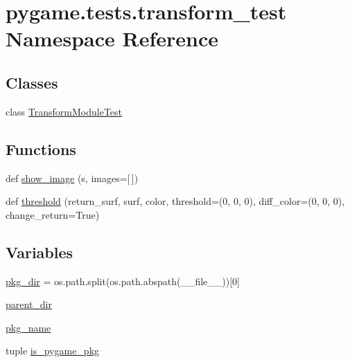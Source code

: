 \hypertarget{namespacepygame_1_1tests_1_1transform__test}{}\section{pygame.\+tests.\+transform\+\_\+test Namespace Reference}
\label{namespacepygame_1_1tests_1_1transform__test}
\subsection*{Classes}
\begin{DoxyCompactItemize}
\item 
class \hyperlink{classpygame_1_1tests_1_1transform__test_1_1_transform_module_test}{Transform\+Module\+Test}
\end{DoxyCompactItemize}
\subsection*{Functions}
\begin{DoxyCompactItemize}
\item 
def \hyperlink{namespacepygame_1_1tests_1_1transform__test_afaa0a3a8b4fe6a56533daf366230f591}{show\+\_\+image} (s, images=\mbox{[}$\,$\mbox{]})
\item 
def \hyperlink{namespacepygame_1_1tests_1_1transform__test_ab035edff24ce1faee9938bec517421ca}{threshold} (return\+\_\+surf, surf, color, threshold=(0, 0, 0), diff\+\_\+color=(0, 0, 0), change\+\_\+return=True)
\end{DoxyCompactItemize}
\subsection*{Variables}
\begin{DoxyCompactItemize}
\item 
\hyperlink{namespacepygame_1_1tests_1_1transform__test_a1efa57556deff07879fc188507a33743}{pkg\+\_\+dir} = os.\+path.\+split(os.\+path.\+abspath(\+\_\+\+\_\+file\+\_\+\+\_\+))\mbox{[}0\mbox{]}
\item 
\hyperlink{namespacepygame_1_1tests_1_1transform__test_a7e4260843f659b897c66df430bc6267c}{parent\+\_\+dir}
\item 
\hyperlink{namespacepygame_1_1tests_1_1transform__test_a556a2bb7e931fdc0ce1169645e27a1e1}{pkg\+\_\+name}
\item 
tuple \hyperlink{namespacepygame_1_1tests_1_1transform__test_a80eb511058f1dae947ae814bdfb56043}{is\+\_\+pygame\+\_\+pkg}
\end{DoxyCompactItemize}


